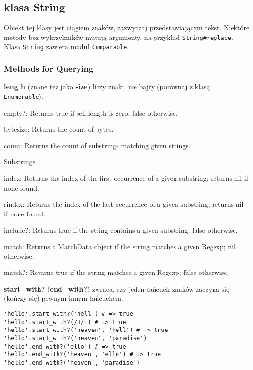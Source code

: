 \subsection{klasa String}
Obiekt tej klasy jest ciągiem znaków, zazwyczaj przedstawiającym tekst.
Niektóre metody bez wykrzykników mutują argumenty, na przykład \texttt{String#replace}.
Klasa \texttt{String} zawiera moduł \texttt{Comparable}.

\subsubsection{Methods for Querying}
\textbf{length} (znane też jako \textbf{size}) liczy znaki, nie bajty (porównaj z klasą \texttt{Enumerable}).

empty?: Returns true if self.length is zero; false otherwise.

bytesize: Returns the count of bytes.

count: Returns the count of substrings matching given strings.

Substrings


index: Returns the index of the first occurrence of a given substring; returns nil if none found.

rindex: Returns the index of the last occurrence of a given substring; returns nil if none found.

include?: Returns true if the string contains a given substring; false otherwise.

match: Returns a MatchData object if the string matches a given Regexp; nil otherwise.

match?: Returns true if the string matches a given Regexp; false otherwise.

\textbf{start\_with?} (\textbf{end\_with?}) zwraca, czy jeden łańcuch znaków zaczyna się (kończy się) pewnym innym łańcuchem.
\begin{verbatim}
'hello'.start_with?('hell') # => true
'hello'.start_with?(/H/i) # => true
'hello'.start_with?('heaven', 'hell') # => true
'hello'.start_with?('heaven', 'paradise')
'hello'.end_with?('ello') # => true
'hello'.end_with?('heaven', 'ello') # => true
'hello'.end_with?('heaven', 'paradise')
\end{verbatim}

